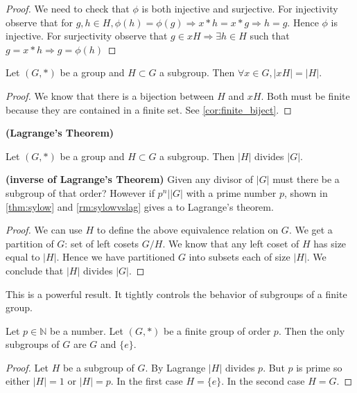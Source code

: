 \documentclass{article}
\newcommand{\bfs}[1]{\textbf{({#1}) }}
\begin{document}
\begin{proof}
We need to check that $\phi$ is both injective and surjective. For injectivity observe that for $g, h \in H, \phi(h)=\phi(g) \Rightarrow x * h=x * g \Rightarrow h=g .$ Hence $\phi$ is injective. For surjectivity observe that $g \in x H \Rightarrow \exists h \in H$ such that $g=x * h \Rightarrow g=\phi(h)$
\end{proof} 
\begin{cora}
{Let} $(G, *)$ be a  group and $H \subset G$ a subgroup. Then $\forall x \in G,|x H|=|H|$.
\end{cora} 
\begin{proof}
We know that there is a bijection between $H$ and $x H$. Both must be finite because they are contained in a finite set.  See \cref{cor:finite_biject}.
\end{proof}

\begin{thma}{\bfs{Lagrange's Theorem}}\label{thm:lag}\\
\centerline{Let $(G, *)$ be a  group and $H \subset G$ a subgroup. Then $|H|$ divides $|G|$.}
\end{thma} 
\begin{rema}{\bfs{inverse of Lagrange’s Theorem}}
Given any divisor of $|G|$ must there be a subgroup of that order? 
However if $p^n||G|$ with a prime number $p$,  shown in \cref{thm:sylow} and \cref{rm:sylowvslag} gives a  to Lagrange's theorem.
\end{rema}
\begin{proof}
We can use $H$ to define the above equivalence relation on $G$. We get a partition of $G$: set of left cosets $G / H$. We know that any left coset of $H$ has size equal to $|H| .$ Hence we have partitioned $G$ into subsets each of size $|H| .$ We conclude that $|H|$ divides $|G|$.
\end{proof}

This is a powerful result. It tightly controls the behavior of subgroups of a finite group. 
\begin{cora}
Let $p \in \mathbb{N}$ be a  number. Let $(G, *)$ be a finite group of order $p$. Then the only subgroups of $G$ are $G$ and $\{e\} .$
\end{cora} 
\begin{proof}
Let $H$ be a subgroup of $G$. By Lagrange $|H|$ divides $p$. But $p$ is prime so either $|H|=1$ or $|H|=p .$ In the first case $H=\{e\} .$ In the second case $H=G$.
\end{proof}
\end{document}
